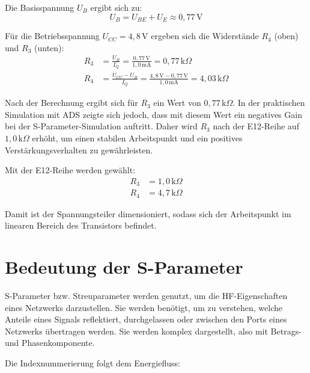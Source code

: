 Die Basisspannung $U_B$ ergibt sich zu:
\begin{equation}
    U_B = U_{BE} + U_E \approx 0{,}77\,\mathrm{V}
\end{equation}

Für die Betriebsspannung $U_{CC} = 4{,}8\,\mathrm{V}$ ergeben sich die Widerstände $R_4$ (oben) und $R_3$ (unten):
\begin{align}
    R_3 &= \frac{U_B}{I_Q} = \frac{0{,}77\,\mathrm{V}}{1{,}0\,\mathrm{mA}} = 0{,}77\,\mathrm{k}\Omega \\
    R_4 &= \frac{U_{CC} - U_B}{I_Q} = \frac{4{,}8\,\mathrm{V} - 0{,}77\,\mathrm{V}}{1{,}0\,\mathrm{mA}} = 4{,}03\,\mathrm{k}\Omega
\end{align}

Nach der Berechnung ergibt sich für $R_3$ ein Wert von $0{,}77\,\mathrm{k}\Omega$. In der praktischen Simulation mit ADS zeigte sich jedoch, dass mit diesem Wert ein negatives Gain bei der S-Parameter-Simulation auftritt. Daher wird $R_3$ nach der E12-Reihe auf $1{,}0\,\mathrm{k}\Omega$ erhöht, um einen stabilen Arbeitspunkt und ein positives Verstärkungsverhalten zu gewährleisten.

Mit der E12-Reihe werden gewählt:
\begin{align*}
    R_3 &= 1{,}0\,\mathrm{k}\Omega \\
    R_4 &= 4{,}7\,\mathrm{k}\Omega
\end{align*}

Damit ist der Spannungsteiler dimensioniert, sodass sich der Arbeitspunkt im linearen Bereich des Transistors befindet.

\section{Bedeutung der S-Parameter}
S-Parameter bzw. Streuparameter werden genutzt, um die HF-Eigenschaften eines
Netzwerks darzustellen. Sie werden benötigt, um zu verstehen, welche Anteile eines Signals
reflektiert, durchgelassen oder zwischen den Ports eines Netzwerks übertragen werden.
Sie werden komplex dargestellt, also mit Betrags- und Phasenkomponente.

Die Indexnummerierung folgt dem Energiefluss:

